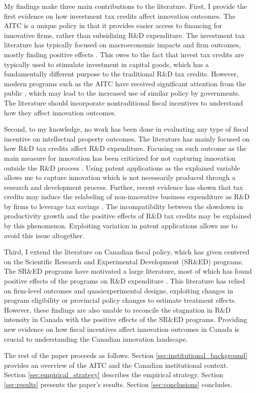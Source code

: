 \documentclass[../main.tex]{subfiles}
\begin{document}
My findings make three main contributions to the literature. First, I provide the first evidence on how investment tax credits affect innovation outcomes. The AITC is a unique policy in that it provides easier access to financing for innovative firms, rather than subsidizing R\&D expenditure. The investment tax literature has typically focused on macroeconomic impacts and firm outcomes, mostly finding positive effects \parencite{pereira94, lyon89, slattery_zidar20}. This owes to the fact that invest tax credits are typically used to stimulate investment in capital goods, which has a fundamentally different purpose to the traditional R\&D tax credits. However, modern programs such as the AITC have received significant attention from the public \parencite{albertachamberofcommerce23,zabjeck16}, which may lead to the increased use of similar policy by governments. The literature should incorporate nontraditional fiscal incentives to understand how they affect innovation outcomes.

Second, to my knowledge, no work has been done in evaluating any type of fiscal incentive on intellectual property outcomes. The literature has mainly focused on how R\&D tax credits affect R\&D expenditure. Focusing on such outcome as the main measure for innovation has been criticized for not capturing innovation outside the R\&D process \parencite{xie_etal19}. Using patent applications as the explained variable allows me to capture innovation which is not necessarily produced through a research and development process. Further, recent evidence has shown that tax credits may induce the relabeling of non-innovative business expenditure as R\&D by firms to leverage tax savings \parencite{chen_etal21}. The incompatibility between the slowdown in productivity growth and the positive effects of R\&D tax credits may be explained by this phenomenon. Exploiting variation in patent applications allows me to avoid this issue altogether.

Third, I extend the literature on Canadian fiscal policy, which has given centered on the Scientific Research and Experimental Development (SR\&ED) programs. The SR\&ED programs have motivated a large literature, most of which has found positive effects of the programs on R\&D expenditure \parencite{agrawal_etal20,czarnitzki_etal11,berube_mohnen09,mansfield_switzer85a,bernstein86b}. This literature has relied on firm-level outcomes and quasiexperimental designs, exploiting changes in program eligibility or provincial policy changes to estimate treatment effects. However, these findings are also unable to reconcile the stagnation in R\&D intensity in Canada with the positive effects of the SR\&ED programs. Providing new evidence on how fiscal incentives affect innovation outcomes in Canada is crucial to understanding the Canadian innovation landscape. 

The rest of the paper proceeds as follows. Section \ref{sec:institutional_background} provides an overview of the AITC and the Canadian institutional context. Section \ref{sec:empirical_strategy} describes the empirical strategy. Section \ref{sec:results} presents the paper's results. Section \ref{sec:conclusions} concludes.
\end{document}
